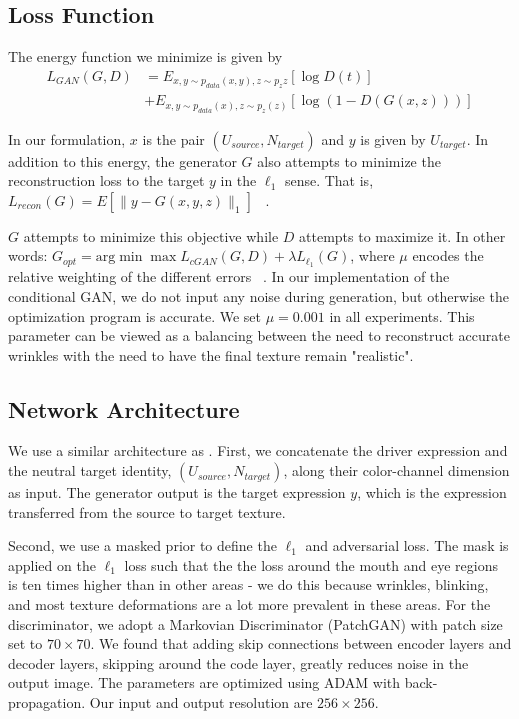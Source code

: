 \subsection{Loss Function}

The energy function we minimize is given by 
\begin{equation} \label{eqn:1}
\begin{split}
L_{GAN}(G,D)& = E_{{x,y}\sim p_{data}({x,y}),z\sim p_z{z}}[\log D({t})]\\
& +E_{{x,y}\sim p_{data}(x),z\sim p_z(z)}[\log(1-D(G(x,z)))] 
\end{split}
\end{equation}

In our formulation, $x$ is the pair $(U_{source}, N_{target})$ and $y$ is given by $U_{target}$.  
In addition to this energy, the generator $G$ also attempts to minimize the reconstruction loss to the target $y$ in the $\ell_1$ sense.  
That is, $L_{recon}(G)= E[\parallel y-G({x,y},z)\parallel_1]$ ~\cite{pix2pix}.

$G$ attempts to minimize this objective while $D$ attempts to maximize it.  In other words:
$ G_{opt}=\text{arg}\min\max L_{cGAN}(G,D)+\lambda L_{\ell_1}(G)$, where $\mu$ 
encodes the relative weighting of the different errors ~\cite{pix2pix}.  In our implementation of the conditional GAN, 
we do not input any noise during generation, but otherwise the optimization program is accurate.  We set $\mu = 0.001$ in all experiments. 
This parameter can be viewed as a balancing between the need to reconstruct accurate wrinkles with the need to have the final texture
remain "realistic".  

\subsection{Network Architecture}


We use a similar architecture as \cite{pix2pix}. 
First, we concatenate the driver expression and the neutral target identity, $(U_{source}, N_{target})$, along their color-channel dimension as input.
The generator output is the target expression $y$, which is the expression transferred from the source to target texture.

Second, we use a masked prior to define the $\ell_1$ and adversarial loss. 
The mask is applied on the $\ell_1$ loss such that the the loss around the mouth and eye regions is ten times higher than in other areas - we
do this because wrinkles, blinking, and most texture deformations are a lot more prevalent in these areas.  
For the discriminator, we adopt a Markovian Discriminator 
(PatchGAN) with patch size set to $70 \times 70$. We found that adding skip connections between
encoder layers and decoder layers, skipping around the code layer, greatly reduces noise in the output image. 
The parameters are
optimized using ADAM with back-propagation. Our input and output resolution are $256\times 256$.


